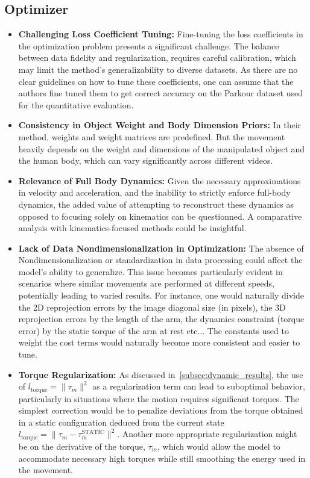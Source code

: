 \subsection{Optimizer}
\begin{itemize}
    \item \textbf{Challenging Loss Coefficient Tuning:} Fine-tuning the loss coefficients in the optimization problem presents a significant 
    challenge. The balance between data fidelity and regularization, requires careful calibration, which may 
    limit the method's generalizability to diverse datasets. As there are no clear guidelines on how to tune these coefficients, one can
    assume that the authors fine tuned them to get correct accuracy on the Parkour dataset used for the quantitative evaluation.

    \item \textbf{Consistency in Object Weight and Body Dimension Priors:} In their method, weights and weight matrices are predefined. 
    But the movement heavily depends on the weight and dimensions of the manipulated object and the human body, which can vary significantly 
    across different videos. 

    \item \textbf{Relevance of Full Body Dynamics:} Given the necessary approximations in velocity and acceleration, and the inability to 
    strictly enforce full-body dynamics, the added value of attempting to reconstruct these dynamics as opposed to focusing 
    solely on kinematics can be questionned. A comparative analysis with kinematics-focused methods could be insightful.

    \item \textbf{Lack of Data Nondimensionalization in Optimization:} The absence of Nondimensionalization or standardization in data processing could 
    affect the model's ability to generalize.
    This issue becomes particularly evident in scenarios where similar movements are performed at 
    different speeds, potentially leading to varied results.
    For instance, one would naturally divide the 2D reprojection errors by the image diagonal size (in pixels), the 3D reprojection errors by the length of the arm,
    the dynamics constraint (torque error) by the static torque of the arm at rest etc... 
    The constants used to weight the cost terms would naturally become more consistent and easier to tune.

    \item \textbf{Torque Regularization:} As discussed in~\cref{subsec:dynamic_results}, the use 
    of \(l_{\text{torque}} = \|\tau_m\|^2\) as a regularization term can lead to suboptimal 
    behavior, particularly in situations where the motion requires significant torques. 
    The simplest correction would be to penalize deviations from the torque obtained in a static configuration deduced from the current state \(l_{\text{torque}} = \|\tau_m - \tau_m^{\textrm{STATIC}} \|^2\).
    Another more appropriate regularization might be on the derivative of the torque, \(\dot{\tau}_m\), which 
    would allow the model to accommodate necessary high torques while still smoothing the energy used in the movement.

\end{itemize}